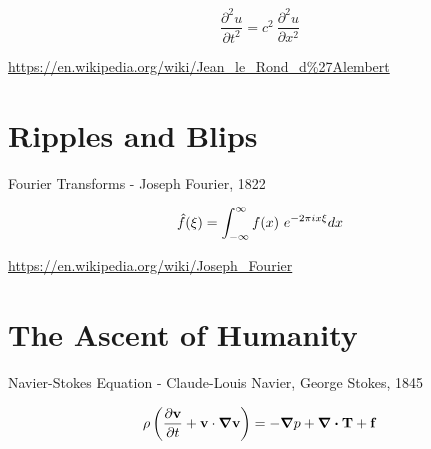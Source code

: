 \documentclass[12pt]{article}
\begin{document}
	\begin{equation*}\frac{\partial^2 u}{\partial t^2} = c^2 \  \frac{\partial^2 u}{\partial x^2} \end{equation*}


\vspace{2em}

\url{https://en.wikipedia.org/wiki/Jean_le_Rond_d%27Alembert}

\newpage


\section{Ripples and Blips}
	
Fourier Transforms - Joseph Fourier, 1822

\vspace{2em}

\begin{equation*} \hat{f}\relax(\xi) = \int_{-\infty}^{\infty} f\relax(x) \  e^{-2\pi i x \xi} dx \end{equation*}

\vspace{2em}

\url{https://en.wikipedia.org/wiki/Joseph_Fourier}
	
\newpage


\section{The Ascent of Humanity}

Navier-Stokes Equation - Claude-Louis Navier, George Stokes, 1845


\vspace{2em}

\begin{equation*}   \rho \left( \frac{\partial{\mathbf{v}}}{\partial{t}} + \mathbf{v} \cdot \grad{\mathbf{v}} \right) = - \grad{p} + \div \mathbf{T} +  \mathbf{f}  \end{equation*}
\end{document}
